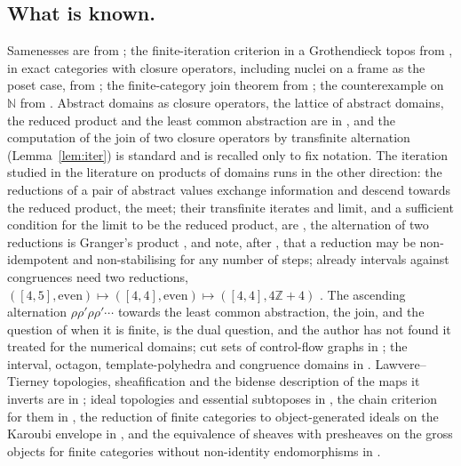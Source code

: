\documentclass[11pt]{amsart}
\theoremstyle{definition}
\begin{document}
\subsection*{What is known.}
Samenesses are from \cite{Same}; the finite-iteration criterion in a
Grothendieck topos from \cite{Stabjoin}, in exact categories with closure
operators, including nuclei on a frame as the poset case, from
\cite{Fijoin}; the finite-category join theorem from \cite{Finitejoin};
the counterexample on $\mathbb N$ from \cite{Topjoin}. Abstract domains as
closure operators, the lattice of abstract domains, the reduced product
and the least common abstraction are in \cite{CC79,Ward,GR97,GRS00}, and
the computation of the join of two closure operators by transfinite
alternation (Lemma~\ref{lem:iter}) is standard and is recalled only to fix
notation. The iteration studied in the literature on products of
domains runs in the other direction: the reductions of a pair of
abstract values exchange information and descend towards the reduced
product, the meet; their transfinite iterates and limit, and a
sufficient condition for the limit to be the reduced product, are
\cite[Thms.~2--5]{CCM11}, the alternation of two reductions is
Granger's product \cite{Granger,CCF13}, and \cite{CCM11} note, after
\cite{Granger}, that a reduction may be non-idempotent and
non-stabilising for any number of steps; already intervals against
congruences need two reductions, $([4,5],\text{even})\mapsto([4,4],
\text{even})\mapsto([4,4],4\mathbb Z+4)$ \cite{CCF13}. The ascending
alternation $\rho\rho'\rho\rho'\cdots$ towards the least common
abstraction, the join, and the question of when it is finite, is the
dual question, and the author has not found it treated for the
numerical domains; cut sets of control-flow graphs in
\cite{Bourdoncle}; the interval, octagon, template-polyhedra and
congruence domains in \cite{CC79,Mine,SSM,Karr,Granger91}. Lawvere--Tierney topologies, sheafification and the
bidense description of the maps it inverts are in \cite{MLM,Elephant};
ideal topologies and essential subtoposes in \cite{KL89,Marques25}, the
chain criterion for them in \cite[Cor.~1.3]{Stabjoin}, the reduction of
finite categories to object-generated ideals on the Karoubi envelope in
\cite[\S2]{Finitejoin}, and the equivalence of sheaves with presheaves
on the gross objects for finite categories without non-identity
endomorphisms in \cite{Friedman}.
\end{document}
